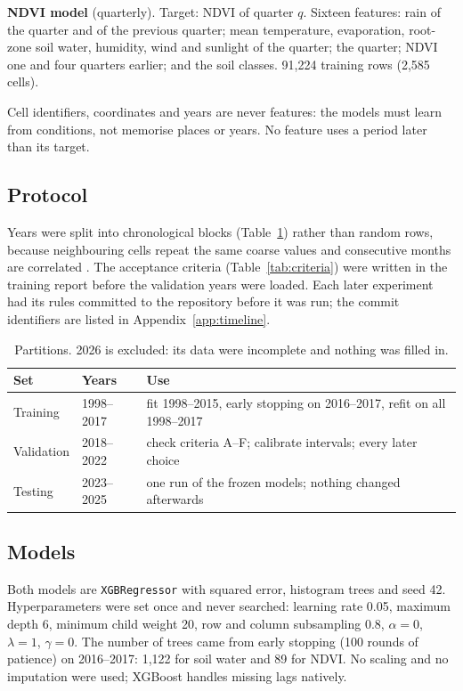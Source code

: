 \documentclass[11pt,a4paper]{article}
\begin{document}
\textbf{NDVI model} (quarterly). Target: NDVI of quarter $q$. Sixteen features: rain of the quarter and of the previous
quarter; mean temperature, evaporation, root-zone soil water, humidity, wind and sunlight of the quarter; the quarter; NDVI
one and four quarters earlier; and the soil classes. 91,224 training rows (2,585 cells).

Cell identifiers, coordinates and years are never features: the models must learn from conditions, not memorise places
or years. No feature uses a period later than its target.

\subsection{Protocol}\label{sec:protocol}
Years were split into chronological blocks (Table~\ref{tab:splits}) rather than random rows, because neighbouring cells
repeat the same coarse values and consecutive months are correlated \citep{roberts2017}. The acceptance criteria
(Table~\ref{tab:criteria}) were written in the training report before the validation years were loaded. Each later
experiment had its rules committed to the repository before it was run; the commit identifiers are listed in
Appendix~\ref{app:timeline}.

\begin{table}[H]
\centering\small
\caption{Partitions. 2026 is excluded: its data were incomplete and nothing was filled in.}
\label{tab:splits}
\begin{tabular}{lll}
\toprule
Set & Years & Use \\
\midrule
Training & 1998--2017 & fit 1998--2015, early stopping on 2016--2017, refit on all 1998--2017 \\
Validation & 2018--2022 & check criteria A--F; calibrate intervals; every later choice \\
Testing & 2023--2025 & one run of the frozen models; nothing changed afterwards \\
\bottomrule
\end{tabular}
\end{table}

\subsection{Models}
Both models are \texttt{XGBRegressor} \citep{chen2016} with squared error, histogram trees and seed 42. Hyperparameters
were set once and never searched: learning rate 0.05, maximum depth 6, minimum child weight 20, row and column
subsampling 0.8, $\alpha=0$, $\lambda=1$, $\gamma=0$. The number of trees came from early stopping (100 rounds of
patience) on 2016--2017: 1,122 for soil water and 89 for NDVI. No scaling and no imputation were used; XGBoost handles
missing lags natively.
\end{document}
